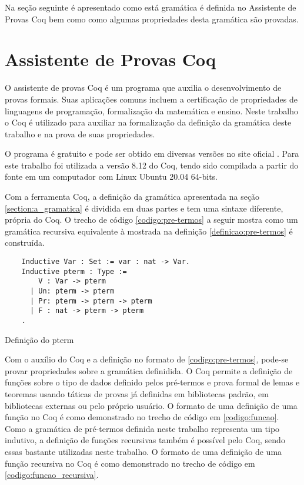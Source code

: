 \documentclass{article}
\newenvironment{codigo}{\captionsetup{type=listing}}{}
\begin{document}
Na seção seguinte é apresentado como está gramática é definida no Assistente de Provas Coq bem como como algumas propriedades desta gramática são provadas.


\section{Assistente de Provas Coq}
\label{section:assistente_coq}

O assistente de provas Coq é um programa que auxilia o desenvolvimento de provas formais. Suas aplicações comuns incluem a certificação de propriedades de linguagens de programação, formalização da matemática e ensino. Neste trabalho o Coq é utilizado para auxiliar na formalização da definição da gramática deste trabalho e na prova de suas propriedades. %

O programa é gratuito e pode ser obtido em diversas versões no site oficial \cite{coqinria}. Para este trabalho foi utilizada a versão 8.12 do Coq, tendo sido compilada a partir do fonte em um computador com Linux Ubuntu 20.04 64-bits.

Com a ferramenta Coq, a definição da gramática apresentada na seção \ref{section:a_gramatica} é dividida em duas partes e tem uma sintaxe diferente, própria do Coq. O trecho de código \ref{codigo:pre-termos} a seguir mostra como um gramática recursiva equivalente à mostrada na definição \ref{definicao:pre-termos} é construída.

\begin{codigo}
\begin{verbatim}
	Inductive Var : Set := var : nat -> Var.
	Inductive pterm : Type :=
	    V : Var -> pterm
	  | Un: pterm -> pterm
	  | Pr: pterm -> pterm -> pterm
	  | F : nat -> pterm -> pterm
	.
\end{verbatim}
\caption{Definição do pterm}
\label{codigo:pre-termos}
\end{codigo}

Com o auxílio do Coq e a definição no formato de \ref{codigo:pre-termos}, pode-se provar propriedades sobre a gramática definidida. O Coq permite a definição de funções sobre o tipo de dados definido pelos pré-termos e prova formal de lemas e teoremas usando táticas de provas já definidas em bibliotecas padrão, em bibliotecas externas ou pelo próprio usuário. O formato de uma definição de uma função no Coq é como demonstrado no trecho de código em \ref{codigo:funcao}. Como a gramática de pré-termos definida neste trabalho representa um tipo indutivo, a definição de funções recursivas também é possível pelo Coq, sendo essas bastante utilizadas neste trabalho. O formato de uma definição de uma função recursiva no Coq é como demonstrado no trecho de código em \ref{codigo:funcao_recursiva}. 
\end{document}
